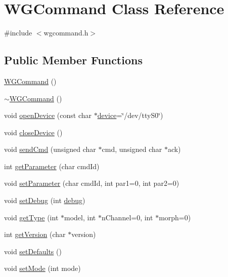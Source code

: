 \hypertarget{classWGCommand}{\section{W\-G\-Command Class Reference}
\label{classWGCommand}
}


{\ttfamily \#include $<$wgcommand.\-h$>$}

\subsection*{Public Member Functions}
\begin{DoxyCompactItemize}
\item 
\hyperlink{classWGCommand_a9b5240b14844df1f1ddbcd1d7fd002dc}{W\-G\-Command} ()
\item 
\hyperlink{classWGCommand_a1476b046244df1ef8b6de59ace33d6e2}{$\sim$\-W\-G\-Command} ()
\item 
void \hyperlink{classWGCommand_a131dd16defc78995a469b076b2970b41}{open\-Device} (const char $\ast$\hyperlink{classWGCommand_ad87845443f95cc2d0fb33299a13de26b}{device}=\char`\"{}/dev/tty\-S0\char`\"{})
\item 
void \hyperlink{classWGCommand_a1ad4abc6d61d3816ac9e038d11bef5e0}{close\-Device} ()
\item 
void \hyperlink{classWGCommand_a4590108efb24e34b24300567c36c23d0}{send\-Cmd} (unsigned char $\ast$cmd, unsigned char $\ast$ack)
\item 
int \hyperlink{classWGCommand_a46dca886ad75d9c742272273d5c9e7e1}{get\-Parameter} (char cmd\-Id)
\item 
void \hyperlink{classWGCommand_a29b808745bdaa0f1687d856659479938}{set\-Parameter} (char cmd\-Id, int par1=0, int par2=0)
\item 
void \hyperlink{classWGCommand_a98093256ad22ec30afb3e2e2e3616fe1}{set\-Debug} (int \hyperlink{classWGCommand_a2e554051536b4ee562c3ccd49071e0be}{debug})
\item 
void \hyperlink{classWGCommand_af8bc46cc6907f71ac248fdde0401d739}{get\-Type} (int $\ast$model, int $\ast$n\-Channel=0, int $\ast$morph=0)
\item 
int \hyperlink{classWGCommand_ac4a1887b09ed43f41b1124f9361dc202}{get\-Version} (char $\ast$version)
\item 
void \hyperlink{classWGCommand_a004a8da3605eaa045549f8307ef68632}{set\-Defaults} ()
\item 
void \hyperlink{classWGCommand_a5b25fc2d24d24e9e02808d2a95639059}{set\-Mode} (int mode)

\end{DoxyCompactItemize}
